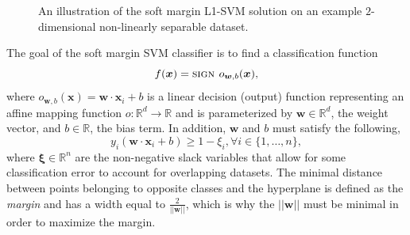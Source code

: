 \documentclass[reqno]{vcuthesis}
\newcommand{\norm}[1]{{||#1||}}
\newcommand{\reals}{{\mathbb{R}}}
\numberwithin{equation}{chapter}
\begin{document}
\begin{figure}[t!]
\begin{minipage}[b]{0.45\textwidth}
\caption{An illustration of the soft margin L1-SVM solution on an example $2$-dimensional non-linearly separable dataset.}
\label{fig:nonlinsepdata}
\end{minipage}
\end{figure}

The goal of the soft margin SVM classifier is to find a classification function
\begin{equation}
\centering
f(\bm x) = \textsc{sign } o_{\bm w,b}(\bm x),
\label{eq:classificationfunction}
\end{equation}
where $o_{\bm w,b}(\bm x) = \bm{w}\cdot\bm{x}_i+b$ is a linear decision (output) function representing an affine mapping function $o: \reals^d \rightarrow \reals$ and is parameterized by $\bm w \in \reals^d$, the weight vector, and $b \in \reals$, the bias term. In addition, $\bm w$ and $b$ must satisfy the following,
\begin{equation}
y_i\left( \bm{w} \cdot \bm{x}_i + b\right) \geq 1 - \xi_i, \forall i \in \{1,\ldots,n\},
\label{eqn:softsvmconstraint}
\end{equation}
where $\bm \xi \in \reals^n$ are the non-negative slack variables that allow for some classification error to account for overlapping datasets. The minimal distance between points belonging to opposite classes and the hyperplane is defined as the \textit{margin} and has a width equal to $\frac{2}{||\bm{w}||}$, which is why the $\norm{\bm w}$ must be minimal in order to maximize the margin. 
\end{document}
